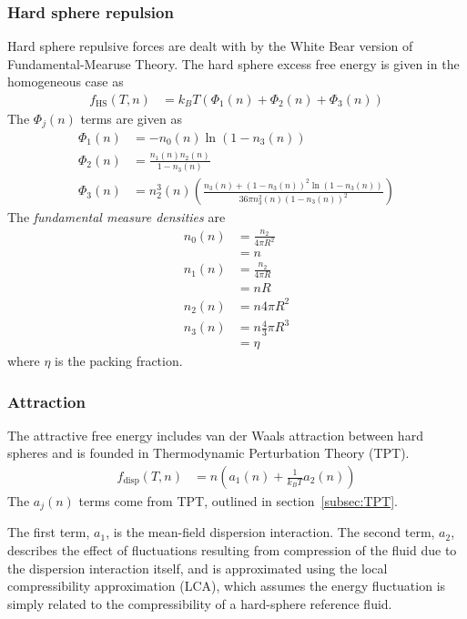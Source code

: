 \documentclass[letterpaper,twocolumn,amsmath,amssymb,prb]{revtex4-1}
\newcommand{\kT}{\ensuremath{k_BT}}
\newcommand{\fhs}{\ensuremath{f_\text{HS}(T,n)}}
\newcommand{\fdisp}{\ensuremath{f_\text{disp}(T,n)}}
\newcommand{\1}{\ensuremath{\textbf{r}_1}}
\newcommand{\2}{\ensuremath{\textbf{r}_2}}
\newcommand{\3}{\ensuremath{\textbf{r}_3}}
\newcommand{\4}{\ensuremath{\textbf{r}_4}}
\begin{document}
\subsubsection{Hard sphere repulsion}\label{sub2sec:HS}
Hard sphere repulsive forces are dealt with by the White Bear version
of Fundamental-Mearuse Theory.\cite{Roth02} The hard sphere excess
free energy is given in the homogeneous case as
\begin{align}
  \fhs &= \kT\left( \Phi_1(n) + \Phi_2(n) + \Phi_3(n) \right)
\end{align}
The $\Phi_j(n)$ terms are given as
\begin{align}
  \Phi_1(n) &= -n_0(n)\ln(1 - n_3(n)) \\
  \Phi_2(n) &= \frac{n_1(n)n_2(n)}{1 - n_3(n)} \\
  \Phi_3(n) &= n_2^3(n)\left( \frac{n_3(n) + (1 - n_3(n))^2\ln(1 - n_3(n))}{36\pi n_3^2(n)(1 - n_3(n))^2} \right)
\end{align}
The \emph{fundamental measure densities} are
\begin{align}
  n_0(n) &= \frac{n_2}{4\pi R^2} \nonumber \\
  &= n \\
  n_1(n) &= \frac{n_2}{4\pi R} \nonumber \\
  &= nR \\
  n_2(n) &= n4\pi R^2 \\
  n_3(n) &= n\frac{4}{3}\pi R^3 \nonumber \\
  &= \eta
\end{align}
where $\eta$ is the packing fraction.

\subsubsection{Attraction}\label{sub2sec:disp}
The attractive free energy includes van der Waals attraction between
hard spheres and is founded in Thermodynamic Perturbation Theory
(TPT).
\begin{align}
  \fdisp &= n \left( a_1(n) + \frac{1}{\kT}a_2(n) \right)
\end{align}
The $a_j(n)$ terms come from TPT, outlined in section~\ref{subsec:TPT}.

The first term, $a_1$, is the mean-field dispersion interaction. The
second term, $a_2$, describes the effect of fluctuations resulting
from compression of the fluid due to the dispersion interaction
itself, and is approximated using the local compressibility
approximation (LCA), which assumes the energy fluctuation is simply
related to the compressibility of a hard-sphere reference
fluid.\cite{Barker76}
\end{document}
